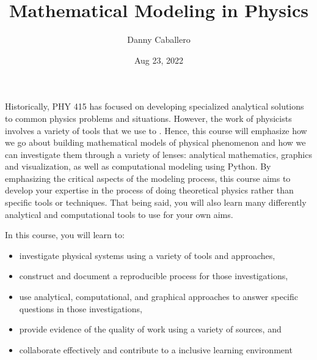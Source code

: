 \documentclass[letterpaper,10pt,english]{jupyterBook}
\title{Mathematical Modeling in Physics}
\date{Aug 23, 2022}
\author{Danny Caballero}
\begin{document}
\pagestyle{empty}
\sphinxmaketitle
\pagestyle{plain}
\sphinxtableofcontents
\pagestyle{normal}
\label{\detokenize{content/intro::doc}}


\begin{DUlineblock}{0em}
\item[] 
\end{DUlineblock}





\begin{DUlineblock}{0em}
\item[] 
\end{DUlineblock}

\sphinxAtStartPar
Historically, PHY 415 has focused on developing specialized analytical solutions to common physics problems and situations. However, the work of physicists involves a variety of tools that we use to . Hence, this course will emphasize how we go about building mathematical models of physical phenomenon and how we can investigate them through a variety of lenses: analytical mathematics, graphics and visualization, as well as computational modeling using Python. By emphasizing the critical aspects of the modeling process, this course aims to develop your expertise in the process of doing theoretical physics rather than specific tools or techniques. That being said, you will also learn many differently analytical and computational tools to use for your own aims.

\begin{DUlineblock}{0em}
\item[] 
\end{DUlineblock}

\sphinxAtStartPar
In this course, you will learn to:
\begin{itemize}
\item {} 
\sphinxAtStartPar
investigate physical systems using a variety of tools and approaches,

\item {} 
\sphinxAtStartPar
construct and document a reproducible process for those investigations,

\item {} 
\sphinxAtStartPar
use analytical, computational, and graphical approaches to answer specific questions in those investigations,

\item {} 
\sphinxAtStartPar
provide evidence of the quality of work using a variety of sources, and

\item {} 
\sphinxAtStartPar
collaborate effectively and contribute to a inclusive learning environment

\end{itemize}
\end{document}
